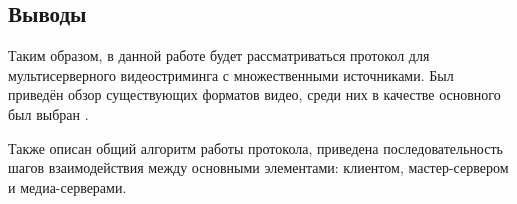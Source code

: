 \subsection*{Выводы}
Таким образом, в данной работе будет рассматриваться протокол для мультисерверного видеостриминга с множественными источниками. Был приведён обзор существующих форматов видео, среди них в качестве основного был выбран . 

Также описан общий алгоритм работы протокола, приведена последовательность шагов взаимодействия между основными элементами: клиентом, мастер-сервером и  медиа-серверами.


















